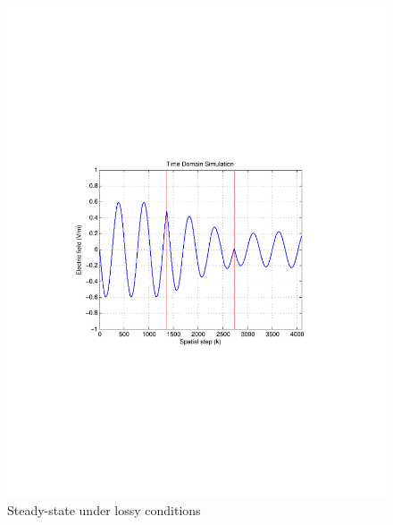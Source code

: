 \begin{figure}[H]
\centering
\includegraphics[scale=0.78, trim=3.5cm 8.7cm 4.5cm 8.75cm, clip]{Figures/FigCh03_1DDNGSteadyStateLossy.pdf}
\caption{Steady-state under lossy conditions}
\label{1DDNG-SteadyState-Lossy}
\end{figure}